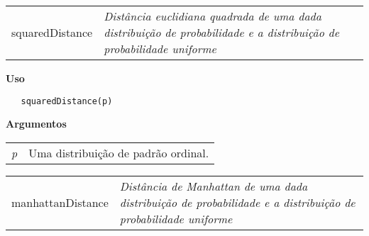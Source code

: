 \documentclass[12pt,letterpaper]{article}
\begin{document}
\hrulefill   

\begin{table}[!h]
\begin{center}
\begin{tabularx}{\textwidth}{ X X}
\hspace{0.5cm} squaredDistance & \textit{Distância euclidiana quadrada de uma dada distribuição de probabilidade e a distribuição de probabilidade uniforme}\\
\end{tabularx}
\end{center}
\end{table} 

\vspace{-0.5cm}

\hrulefill  

\vspace{0.5cm}

\textbf{Uso}

\begin{lstlisting}
   squaredDistance(p)
\end{lstlisting}

\vspace{0.5cm}

\textbf{Argumentos}

\begin{table}[!h]
\begin{center}
\begin{tabularx}{\textwidth}{X X}
\hspace{0.5cm} \textit{p} & Uma distribuição de padrão ordinal.\\
\end{tabularx}
\end{center}
\end{table} 

\newpage


\hrulefill   

\begin{table}[!h]
\begin{center}
\begin{tabularx}{\textwidth}{ X X}
\hspace{0.5cm} manhattanDistance & \textit{Distância de Manhattan de uma dada distribuição de probabilidade e a distribuição de probabilidade uniforme}\\
\end{tabularx}
\end{center}
\end{table} 
\end{document}
